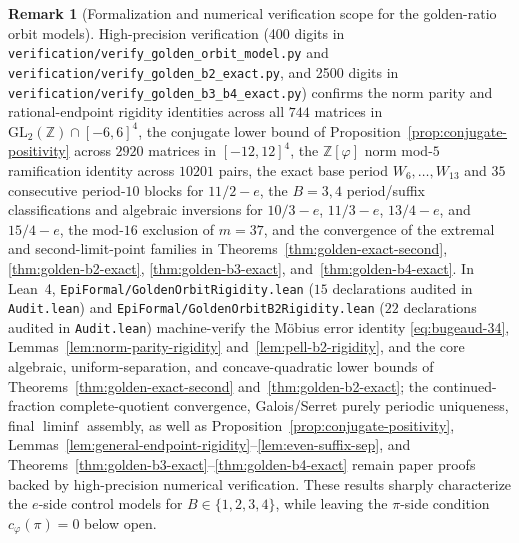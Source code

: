 \documentclass[11pt]{amsart}
\theoremstyle{definition}
\newtheorem{remark}[theorem]{Remark}
\theoremstyle{remark}
\numberwithin{equation}{section}
\newcommand{\Z}{\mathbb{Z}}
\begin{document}
\begin{remark}[Formalization and numerical verification scope for the golden-ratio orbit models]\label{rem:golden-b2-model}
High-precision verification (400 digits in
\texttt{verification/\allowbreak{}verify\_\allowbreak{}golden\_\allowbreak{}orbit\_\allowbreak{}model.py}
and \texttt{verification/\allowbreak{}verify\_\allowbreak{}golden\_\allowbreak{}b2\_\allowbreak{}exact.py},
and 2500 digits in
\texttt{verification/\allowbreak{}verify\_\allowbreak{}golden\_\allowbreak{}b3\_\allowbreak{}b4\_\allowbreak{}exact.py})
confirms the norm parity and rational-endpoint rigidity identities across
all $744$ matrices in $\mathrm{GL}_2(\Z)\cap[-6,6]^4$, the conjugate lower
bound of Proposition~\ref{prop:conjugate-positivity} across $2920$ matrices in
$[-12,12]^4$, the $\Z[\varphi]$ norm mod-$5$ ramification identity across
$10201$ pairs, the exact base period $W_6,\ldots,W_{13}$ and $35$ consecutive
period-$10$ blocks for $11/2-e$, the $B=3,4$ period/suffix classifications
and algebraic inversions for $10/3-e$, $11/3-e$, $13/4-e$, and $15/4-e$,
the mod-$16$ exclusion of $m=37$, and the convergence of the extremal and
second-limit-point families in Theorems~\ref{thm:golden-exact-second},
\ref{thm:golden-b2-exact}, \ref{thm:golden-b3-exact},
and~\ref{thm:golden-b4-exact}. In Lean~4,
\texttt{EpiFormal/\allowbreak{}GoldenOrbit\allowbreak{}Rigidity.lean}
($15$ declarations audited in \texttt{Audit.lean}) and
\texttt{EpiFormal/\allowbreak{}GoldenOrbit\allowbreak{}B2Rigidity.lean}
($22$ declarations audited in \texttt{Audit.lean})
machine-verify the M\"obius error identity \eqref{eq:bugeaud-34},
Lemmas~\ref{lem:norm-parity-rigidity} and~\ref{lem:pell-b2-rigidity}, and
the core algebraic, uniform-separation, and concave-quadratic lower bounds of
Theorems~\ref{thm:golden-exact-second} and~\ref{thm:golden-b2-exact}; the
continued-fraction complete-quotient convergence, Galois/Serret purely
periodic uniqueness, final $\liminf$ assembly, as well as
Proposition~\ref{prop:conjugate-positivity},
Lemmas~\ref{lem:general-endpoint-rigidity}--\ref{lem:even-suffix-sep},
and Theorems~\ref{thm:golden-b3-exact}--\ref{thm:golden-b4-exact} remain
paper proofs backed by high-precision numerical verification.
These results sharply characterize the $e$-side control models for
$B\in\{1,2,3,4\}$, while leaving the $\pi$-side condition $c_\varphi(\pi)=0$
below open.
\end{remark}
\end{document}

